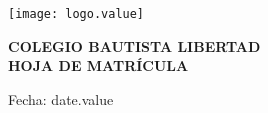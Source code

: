 \documentclass[12pt]{article}
\newcommand{\printDate}{date.value}
\begin{document}
    \begin{minipage}[c][2.5cm]{0.2\textwidth}
        \texttt{[image: logo.value]}
    \end{minipage}
    \begin{minipage}[c][2.5cm]{0.6\textwidth}
        \begin{center}
            \textbf{\large COLEGIO BAUTISTA LIBERTAD\\HOJA DE MATRÍCULA}
        \end{center}
    \end{minipage}

    \hfill Fecha: \printDate
\end{document}
